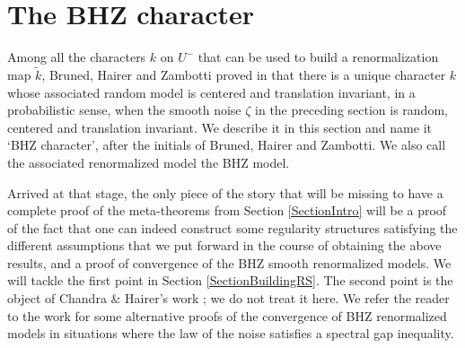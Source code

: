 \documentclass[10pt, reqno]{amsart}
\numberwithin{subsection}{section}
\numberwithin{subsubsection}{subsection}
\numberwithin{equation}{section} %
\theoremstyle{mystyle}
\theoremstyle{mystyle2}
\theoremstyle{mystyle3}
\newcommand{\ssk}{\smallskip}
\begin{document}
\bigskip



\section{The BHZ character}
\label{SectionBHZCharacter}

Among all the characters $k$ on $U^-$ that can be used to build a renormalization map $\widetilde{k}$, Bruned, Hairer and Zambotti proved in \cite{BHZ} that there is a unique character $k$ whose associated random model is centered and translation invariant, in a probabilistic sense, when the smooth noise $\zeta$ in the preceding section is random, centered and translation invariant. We describe it in this section and name it `BHZ character', after the initials of Bruned, Hairer and Zambotti. We also call the associated renormalized model the BHZ model.

\ssk

Arrived at that stage, the only piece of the story that will be missing to have a complete proof of the meta-theorems from Section \ref{SectionIntro} will be a proof of the fact that one can indeed construct some regularity structures satisfying the different assumptions that we put forward in the course of obtaining the above results, and a proof of convergence of the BHZ smooth renormalized models. We will tackle the first point in Section \ref{SectionBuildingRS}. The second point is the object of Chandra \& Hairer's work \cite{ChandraHairer}; we do not treat it here. We refer the reader to the work \cite{LOTT, HS, BH23} for some alternative proofs of the convergence of BHZ renormalized models in situations where the law of the noise satisfies a spectral gap inequality.

\medskip
\end{document}
